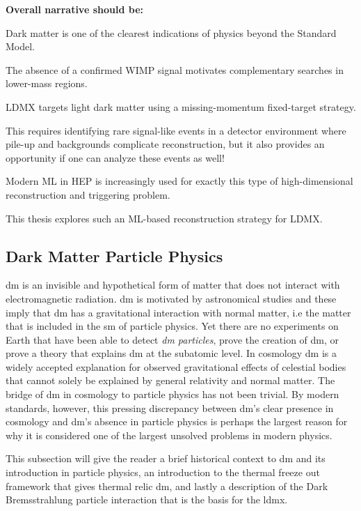 \textbf{Overall narrative should be:}

Dark matter is one of the clearest indications of physics beyond the Standard Model.

The absence of a confirmed WIMP signal motivates complementary searches in lower-mass regions.

LDMX targets light dark matter using a missing-momentum fixed-target strategy.

This requires identifying rare signal-like events in a detector environment where pile-up and backgrounds complicate reconstruction, but it also provides an opportunity if one can analyze these events as well!

Modern ML in HEP is increasingly used for exactly this type of high-dimensional reconstruction and triggering problem.

This thesis explores such an ML-based reconstruction strategy for LDMX.


\subsection{Dark Matter Particle Physics}
\label{sec:dm_particle_physics}


\gls{dm} is an invisible and hypothetical form of matter that does not interact with electromagnetic radiation. \gls{dm} is motivated by astronomical studies and these imply that \gls{dm} has a gravitational interaction with normal matter, i.e the matter that is included in the \gls{sm} of particle physics. Yet there are no experiments on Earth that have been able to detect \textit{\gls{dm} particles}, prove the creation of \gls{dm}, or prove a theory that explains \gls{dm} at the subatomic level. In cosmology \gls{dm} is a widely accepted explanation for observed gravitational effects of celestial bodies that cannot solely be explained by general relativity and normal matter. The bridge of \gls{dm} in cosmology to particle physics has not been trivial. By modern standards, however, this pressing discrepancy between \gls{dm}'s clear presence in cosmology and \gls{dm}'s absence in particle physics is perhaps the largest reason for why it is considered one of the largest unsolved problems in modern physics. \cite{bertone2016-history-dark-matter} \cite{cirelli2026-darkmatter} 

This subsection will give the reader a brief historical context to \gls{dm} and its introduction in particle physics, an introduction to the thermal freeze out framework that gives thermal relic \gls{dm}, and lastly a description of the Dark Bremsstrahlung particle interaction that is the basis for the \gls{ldmx}.


